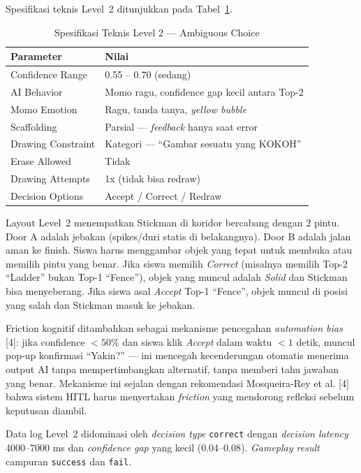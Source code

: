 \documentclass[10pt,twoside,openright]{report}
\begin{document}
Spesifikasi teknis Level~2 ditunjukkan pada Tabel~\ref{tab:level2-spec}.

\begin{table}[H]
\centering
\caption{Spesifikasi Teknis Level 2 --- Ambiguous Choice}
\label{tab:level2-spec}
\begin{tabular}{|l|l|}
\hline
\textbf{Parameter} & \textbf{Nilai} \\ \hline
Confidence Range & 0.55 -- 0.70 (sedang) \\ \hline
AI Behavior & Momo ragu, confidence gap kecil antara Top-2 \\ \hline
Momo Emotion & Ragu, tanda tanya, \textit{yellow bubble} \\ \hline
Scaffolding & Parsial --- \textit{feedback} hanya saat error \\ \hline
Drawing Constraint & Kategori --- ``Gambar sesuatu yang KOKOH'' \\ \hline
Erase Allowed & Tidak \\ \hline
Drawing Attempts & 1x (tidak bisa redraw) \\ \hline
Decision Options & Accept / Correct / Redraw \\ \hline
\end{tabular}
\end{table}

Layout Level~2 menempatkan Stickman di koridor bercabang dengan 2 pintu. Door A adalah jebakan (spikes/duri statis di belakangnya). Door B adalah jalan aman ke finish. Siswa harus menggambar objek yang tepat untuk membuka atau memilih pintu yang benar. Jika siswa memilih \textit{Correct} (misalnya memilih Top-2 ``Ladder'' bukan Top-1 ``Fence''), objek yang muncul adalah \textit{Solid} dan Stickman bisa menyeberang. Jika siswa asal \textit{Accept} Top-1 ``Fence'', objek muncul di posisi yang salah dan Stickman masuk ke jebakan.

Friction kognitif ditambahkan sebagai mekanisme pencegahan \textit{automation bias} [4]: jika confidence $< 50\%$ dan siswa klik \textit{Accept} dalam waktu $< 1$ detik, muncul pop-up konfirmasi ``Yakin?'' --- ini mencegah kecenderungan otomatis menerima output AI tanpa mempertimbangkan alternatif, tanpa memberi tahu jawaban yang benar. Mekanisme ini sejalan dengan rekomendasi Mosqueira-Rey et al. [4] bahwa sistem HITL harus menyertakan \textit{friction} yang mendorong refleksi sebelum keputusan diambil.

Data log Level~2 didominasi oleh \textit{decision type} \texttt{correct} dengan \textit{decision latency} 4000--7000 ms dan \textit{confidence gap} yang kecil (0.04--0.08). \textit{Gameplay result} campuran \texttt{success} dan \texttt{fail}.
\end{document}
